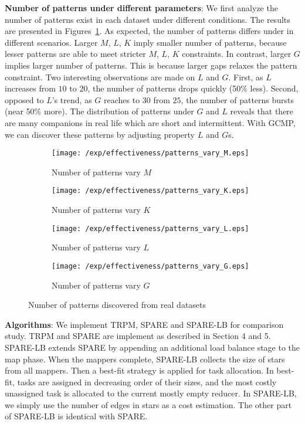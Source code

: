 \textbf{Number of patterns under different parameters}: We first 
analyze the number of patterns exist in each dataset under different conditions. The results are presented in Figures~\ref{exp:patterns_vary}. As expected, the number of patterns differs under in different scenarios. Larger $M$, $L$, $K$ imply smaller number of patterns, because lesser patterns are able to meet stricter $M$, $L$, $K$ constraints. In contrast, larger $G$ implies larger number of patterns. This is because larger gaps relaxes the pattern constraint. Two interesting observations are made on $L$ and $G$.
First, as $L$ increases from $10$ to $20$, the number of patterns drops quickly (50\% less). Second, opposed to $L$'s trend, as $G$ reaches to $30$ from $25$, the number of patterns bursts (near 50\% more). The distribution of patterns under $G$ and $L$ reveals that there are many companions in real life which are short and intermittent. With GCMP, we can discover these patterns by adjusting property $L$ and $G$s.


\begin{figure}[h]
\centering
 	 \begin{subfigure}[b]{0.23\textwidth}
        \texttt{[image: /exp/effectiveness/patterns\_vary\_M.eps]}
        \caption{Number of patterns vary $M$}
    \end{subfigure}
    \begin{subfigure}[b]{0.23\textwidth}
        \texttt{[image: /exp/effectiveness/patterns\_vary\_K.eps]}
        \caption{Number of patterns vary $K$}
    \end{subfigure}  
    \begin{subfigure}[b]{0.23\textwidth}
        \texttt{[image: /exp/effectiveness/patterns\_vary\_L.eps]}
        \caption{Number of patterns vary $L$}
    \end{subfigure}
    \begin{subfigure}[b]{0.23\textwidth}
        \texttt{[image: /exp/effectiveness/patterns\_vary\_G.eps]}
        \caption{Number of patterns vary $G$}
    \end{subfigure}    
\caption{Number of patterns discovered from real datasets}
\label{exp:patterns_vary}
\end{figure}


\textbf{Algorithms}: We implement TRPM, SPARE and SPARE-LB for comparison study. TRPM and SPARE are implement as described in Section 4 and 5. SPARE-LB extends SPARE by appending an additional load balance stage to the map phase. 
When the mappers complete, SPARE-LB collects the size of stars from all mappers. 
Then a best-fit strategy is applied for task allocation. In best-fit, 
tasks are assigned in decreasing order of their sizes, and the most costly
unassigned task is allocated to the current mostly empty reducer. 
In SPARE-LB, we simply use the number of edges in stars as a cost estimation. The other
part of SPARE-LB is identical with SPARE.





